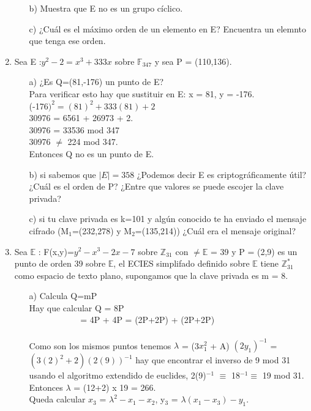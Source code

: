 \documentclass[10pt,a4paper]{article}
\begin{document}
\begin{enumerate}
\begin{itemize}
\item[b)] Muestra que E no es un grupo cíclico.
\item[c)] ¿Cuál es el máximo orden de un elemento en E? Encuentra un elemnto que tenga ese orden.
\end{itemize}
\item Sea E :$y^{2}-2=x^{3}+333x$ sobre $\mathbb{F}_{347}$ y sea P = (110,136).
\begin{itemize}
\item[a)] ¿Es Q=(81,-176) un punto de E?\\
Para verificar esto hay que sustituir en E: x = 81, y = -176.\\
(-176$)^{2} = (81)^{2} + 333(81) + 2 $\\
30976 = 6561 + 26973 + 2. \\
30976 = 33536 mod 347 \\
30976 $\neq$ 224 mod 347.\\
Entonces Q no es un punto de E.
\item[b)] si sabemos que $|E| = 358$ ¿Podemos decir E es criptográficamente útil?
¿Cuál es el orden de P? ¿Entre que valores se puede escojer la clave privada?
\item[c)] si tu clave privada es k=101 y algún conocido te ha enviado el mensaje cifrado (M$_1$=(232,278) y M$_2$=(135,214)) ¿Cuál era el mensaje original?
\end{itemize}
\item Sea $\mathbb{E}$ : F(x,y)=$y^{2}-x^{3}-2x-7$ sobre $\mathbb{Z}_{31}$ con $\neq \mathbb{E}$ = 39 y P = (2,9) es un punto de orden 39 sobre $\mathbb{E}$, el ECIES simplifado definido sobre $\mathbb{E}$ tiene $\mathbb{Z}^{*}_{31}$ como espacio de texto plano, supongamos que la clave privada es m = 8.
\begin{itemize}
\item[a)] Calcula Q=mP\\
Hay que calcular Q = 8P\\$ ~~~~~~~~~~~~~~~~~~~~~~~~~~~$= 4P + 4P = (2P+2P) + (2P+2P)\\\\
Como son los mismos puntos tenemos $\lambda$ = (3$x_{1}^{2}$ + A) $(2y_{1})^{-1}$ = $(3(2)^{2} + 2)(2(9))^{-1}$ hay que encontrar el inverso de 9 mod 31 usando el algoritmo extendido de euclides, 2(9)$^{-1}$ $\equiv$ 18$^{-1} \equiv $ 19 mod 31.\\
Entonces $\lambda$ = (12+2) x 19 = 266.\\
Queda calcular $x_{3}$ = $\lambda^{2} - x_{1} - x_{2}$, y$_3$ = $\lambda(x_{1} - x_{3}) - y_{1}$.

\end{itemize}
\end{enumerate}
\end{document}
